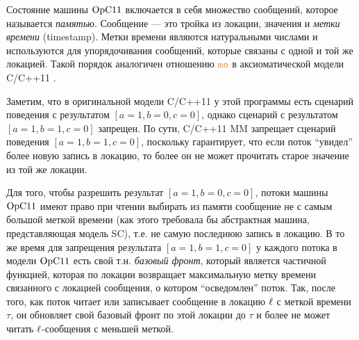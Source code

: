 Состояние машины $\mathrm{OpC11}$ включается в себя множество сообщений, которое называется 
\emph{памятью}. Сообщение --- это тройка из локации, значения и \emph{метки времени} (timestamp).
Метки времени являются натуральными числами и используются для упорядочивания сообщений, которые связаны с одной и той же локацией.
Такой порядок аналогичен отношению $\lMO$ в аксиоматической модели C/C++11 \cite{Batty-al:POPL11}.

Заметим, что в оригинальной модели C/C++11 \cite{Batty-al:POPL11} у этой программы есть сценарий поведения
с результатом $[a = 1, b = 0, c = 0]$, однако сценарий с результатом $[a = 1, b = 1, c = 0]$ запрещен.
По сути, C/C++11 MM запрещает сценарий поведения $[a = 1, b = 1, c = 0]$, поскольку гарантирует, что если поток
``увидел'' более новую запись в локацию, %
то более он не может прочитать старое значение из той же локации.

Для того, чтобы разрешить результат $[a = 1, b = 0, c = 0]$, потоки машины $\mathrm{OpC11}$ имеют право при чтении выбирать из памяти
сообщение не с самым большой меткой времени (как этого требовала бы абстрактная машина, представляющая модель SC), т.е.
не самую последнюю запись в локацию.
В то же время для запрещения результата $[a = 1, b = 1, c = 0]$ у каждого потока в модели $\mathrm{OpC11}$ есть свой т.н. \emph{базовый фронт},
который является частичной функцией, которая по локации возвращает максимальную метку времени связанного с локацией сообщения, о
котором ``осведомлен'' поток.
Так, после того, как поток читает или записывает сообщение в локацию $\ell$ с меткой времени $\tau$, он обновляет
свой базовый фронт по этой локации до $\tau$ и более не может читать $\ell$-сообщения с меньшей меткой.


